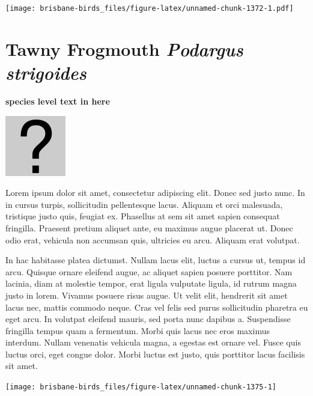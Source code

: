 \documentclass[]{book}
\let\origfigure\figure
\let\endorigfigure\endfigure
\renewenvironment{figure}[1][2] {
  \expandafter\origfigure\expandafter[H]
} {
  \endorigfigure
}
\begin{document}
\begin{figure}
\centering
\texttt{[image: brisbane-birds\_files/figure-latex/unnamed-chunk-1372-1.pdf]}
\caption{\label{fig:unnamed-chunk-1372}insert figure caption}
\end{figure}

\section{\texorpdfstring{Tawny Frogmouth \emph{Podargus
strigoides}}{Tawny Frogmouth Podargus strigoides}}\label{tawny-frogmouth-podargus-strigoides}

\textbf{species level text in here}

\begin{figure}
\centering
\includegraphics{assets/missing.png}
\caption{No image for species}
\end{figure}

Lorem ipsum dolor sit amet, consectetur adipiscing elit. Donec sed justo
nunc. In in cursus turpis, sollicitudin pellentesque lacus. Aliquam et
orci malesuada, tristique justo quis, feugiat ex. Phasellus at sem sit
amet sapien consequat fringilla. Praesent pretium aliquet ante, eu
maximus augue placerat ut. Donec odio erat, vehicula non accumsan quis,
ultricies eu arcu. Aliquam erat volutpat.

In hac habitasse platea dictumst. Nullam lacus elit, luctus a cursus ut,
tempus id arcu. Quisque ornare eleifend augue, ac aliquet sapien posuere
porttitor. Nam lacinia, diam at molestie tempor, erat ligula vulputate
ligula, id rutrum magna justo in lorem. Vivamus posuere risus augue. Ut
velit elit, hendrerit sit amet lacus nec, mattis commodo neque. Cras vel
felis sed purus sollicitudin pharetra eu eget arcu. In volutpat eleifend
mauris, sed porta nunc dapibus a. Suspendisse fringilla tempus quam a
fermentum. Morbi quis lacus nec eros maximus interdum. Nullam venenatis
vehicula magna, a egestas est ornare vel. Fusce quis luctus orci, eget
congue dolor. Morbi luctus est justo, quis porttitor lacus facilisis sit
amet.

\begin{figure}
\texttt{[image: brisbane-birds\_files/figure-latex/unnamed-chunk-1375-1]} \caption{insert figure caption}\label{fig:unnamed-chunk-1375}
\end{figure}
\end{document}
